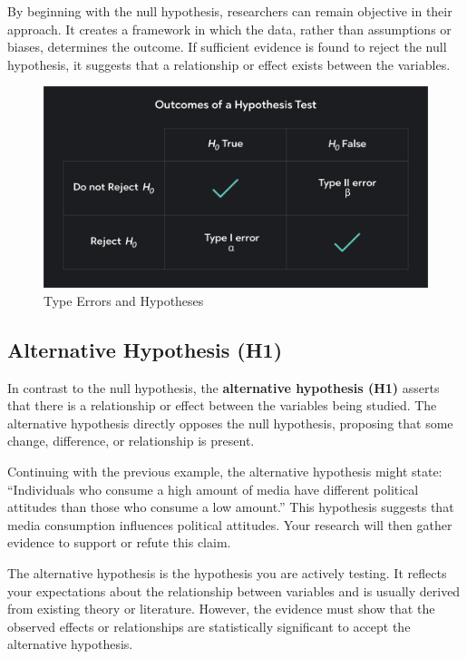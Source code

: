 \documentclass[
]{book}
\begin{document}
By beginning with the null hypothesis, researchers can remain objective in their approach. It creates a framework in which the data, rather than assumptions or biases, determines the outcome. If sufficient evidence is found to reject the null hypothesis, it suggests that a relationship or effect exists between the variables.

\begin{figure}
\centering
\includegraphics[width=1\textwidth,height=\textheight]{images/h0-ha.png}
\caption{Type Errors and Hypotheses}
\end{figure}

\subsection*{Alternative Hypothesis (H1)}\label{alternative-hypothesis-h1}

In contrast to the null hypothesis, the \textbf{alternative hypothesis (H1)} asserts that there is a relationship or effect between the variables being studied. The alternative hypothesis directly opposes the null hypothesis, proposing that some change, difference, or relationship is present.

Continuing with the previous example, the alternative hypothesis might state: ``Individuals who consume a high amount of media have different political attitudes than those who consume a low amount.'' This hypothesis suggests that media consumption influences political attitudes. Your research will then gather evidence to support or refute this claim.

The alternative hypothesis is the hypothesis you are actively testing. It reflects your expectations about the relationship between variables and is usually derived from existing theory or literature. However, the evidence must show that the observed effects or relationships are statistically significant to accept the alternative hypothesis.
\end{document}
